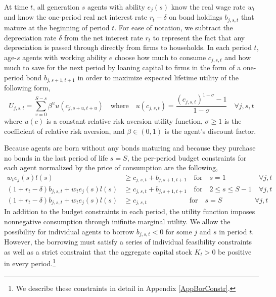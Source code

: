 \documentclass[letterpaper,12pt]{article}
\theoremstyle{definition}
\begin{document}
\begin{spacing}{1.5}
  At time $t$, all generation $s$ agents with ability $e_j(s)$ know the real wage rate $w_t$ and know the one-period real net interest rate $r_t - \delta$ on bond holdings $b_{j,s,t}$ that mature at the beginning of period $t$. For ease of notation, we subtract the depreciation rate $\delta$ from the net interest rate $r_t$ to represent the fact that any depreciation is passed through directly from firms to households. In each period $t$, age-$s$ agents with working ability $e$ choose how much to consume $c_{j,s,t}$ and how much to save for the next period by loaning capital to firms in the form of a one-period bond $b_{j,s+1,t+1}$ in order to maximize expected lifetime utility of the following form,
  \begin{equation}\label{EqUtilMax}
     U_{j,s,t} = \sum_{v=0}^{S-s}\beta^u u\left(c_{j,s+u,t+u}\right) \quad \text{where} \quad u\left(c_{j,s,t}\right) = \frac{\left(c_{j,s,t}\right)^{1-\sigma} - 1}{1-\sigma} \quad\forall j,s,t
  \end{equation}
  where $u(c)$ is a constant relative risk aversion utility function, $\sigma\geq 1$ is the coefficient of relative risk aversion, and $\beta\in(0,1)$ is the agent's discount factor.

  Because agents are born without any bonds maturing and because they purchase no bonds in the last period of life $s=S$, the per-period budget constraints for each agent normalized by the price of consumption are the following,
  \begin{align}
     w_t e_j(s)l(s) &\geq c_{j,s,t} + b_{j,s+1,t+1} \quad \text{for} \quad s = 1 \quad\quad\quad\quad\:\:\: \forall j,t \label{EqBC1} \\
     \left(1 + r_t - \delta\right) b_{j,s,t} + w_t e_j(s)l(s) &\geq c_{j,s,t} + b_{j,s+1,t+1} \quad \text{for} \quad 2\leq s \leq S-1 \quad \forall j,t \label{EqBC2} \\
     \left(1 + r_t - \delta\right) b_{j,s,t} + w_t e_j(s)l(s) &\geq c_{j,s,t} \quad\quad\quad\quad\quad\quad \text{for} \quad s = S \quad\quad\quad\quad\:\:\, \forall j,t \label{EqBC3}
  \end{align}
  In addition to the budget constraints in each period, the utility function imposes nonnegative consumption through inifinite marginal utility. We allow the possibility for individual agents to borrow $b_{j,s,t}<0$ for some $j$ and $s$ in period $t$. However, the borrowing must satisfy a series of individual feasibility constraints as well as a strict constraint that the aggregate capital stock $K_t>0$ be positive in every period.\footnote{We describe these constraints in detail in Appendix \ref{AppBorConstr}.}


\end{spacing}
\end{document}
